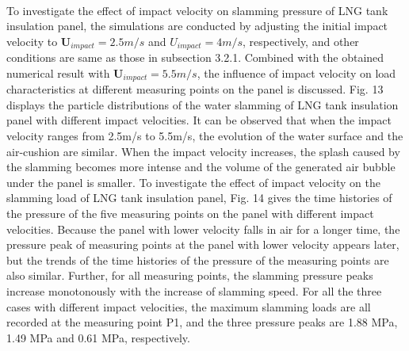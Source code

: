 \documentclass[UTF8]{ctexart}
\begin{document}
\paragraph{\quad}To investigate the effect of impact velocity on slamming pressure of LNG tank insulation panel, the 
                simulations are conducted by adjusting the initial impact velocity to $\mathbf{U}_{impact} = 2.5m/s$ and 
                $U_{impact} = 4m/s$, respectively, and other conditions are same as those in subsection 3.2.1. 
                Combined with the obtained numerical result with $\mathbf{U}_{impact} = 5.5m/s$, the influence of impact 
                velocity on load characteristics at different measuring points on the panel is discussed. 
                Fig. 13 displays the particle distributions of the water slamming of LNG tank insulation 
                panel with different impact velocities. It can be observed that when the impact velocity 
                ranges from 2.5m/s to 5.5m/s, the evolution of the water surface and the air-cushion are similar. 
                When the impact velocity increases, the splash caused by the slamming becomes more intense and the 
                volume of the generated air bubble under the panel is smaller. To investigate the effect of impact 
                velocity on the slamming load of LNG tank insulation panel, Fig. 14 gives the time histories of the 
                pressure of the five measuring points on the panel with different impact velocities. Because the panel 
                with lower velocity falls in air for a longer time, the pressure peak of measuring points at the panel 
                with lower velocity appears later, but the trends of the time histories of the pressure of the measuring 
                points are also similar. Further, for all measuring points, the slamming pressure peaks increase 
                monotonously with the increase of slamming speed. For all the three cases with different impact 
                velocities, the maximum slamming loads are all recorded at the measuring point P1, and the three 
                pressure peaks are 1.88 MPa, 1.49 MPa and 0.61 MPa, respectively.
\end{document}
